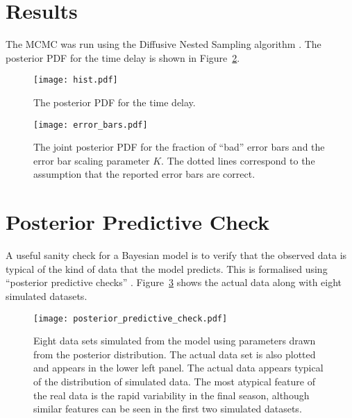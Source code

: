 \documentclass[a4paper, 10pt]{article}
\begin{document}
\section{Results}
The MCMC was run using the Diffusive Nested Sampling algorithm
\citep[][software available at {\tt http://github.com/eggplantbren/DNest3}]{dnest}.
The posterior PDF for the time delay is shown in Figure~\ref{fig:time_delay}.

\begin{figure}
\begin{center}
\texttt{[image: hist.pdf]}
\caption{The posterior PDF for the time delay.\label{fig:time_delay}}
\end{center}
\end{figure}

\begin{figure}
\begin{center}
\texttt{[image: error\_bars.pdf]}
\caption{The joint posterior PDF for the fraction of ``bad'' error bars
and the error bar scaling parameter $K$. The dotted lines correspond to the
assumption that the reported error bars are correct.\label{fig:time_delay}}
\end{center}
\end{figure}

\section{Posterior Predictive Check}
A useful sanity check for a Bayesian model is to verify that the observed data
is typical of the kind of data that the model predicts. This is formalised
using ``posterior predictive checks'' \citep{gelman}. Figure~\ref{fig:ppc}
shows the actual data along with eight simulated datasets.

\begin{figure}
\begin{center}
\texttt{[image: posterior\_predictive\_check.pdf]}
\caption{Eight data sets simulated from the model
using parameters drawn from the posterior distribution. The actual data set
is also plotted and appears in the lower left panel. The actual data appears
typical of the distribution of simulated data. The most atypical feature of
the real data is the rapid variability in the final season, although similar
features can be seen in the first two simulated datasets.
\label{fig:ppc}}
\end{center}
\end{figure}
\end{document}
